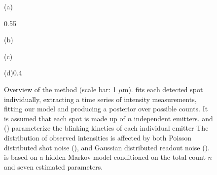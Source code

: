 \begin{figure}[t]

  \begin{panel}{(a)}{\textwidth}
    \vspace{5mm}
    \small
    
    \vspace{-2mm}
  \end{panel}

  \begin{panelcolumn}{0.55\textwidth}
    \begin{panel}{(b)}{\textwidth}
      \small
      \centerline{}
    \end{panel}

    \begin{panel}{(c)}{\textwidth}
      \small
      \hspace{4mm}
      
    \end{panel}
  \end{panelcolumn}
  \begin{panel}{(d)}{0.4\textwidth}
    \small
    \vspace{4mm}
    \hspace{4mm}
    \centerline{}
  \end{panel}

  \caption{
       Overview of the \ours method (scale bar: 1 $\mu$m). 
      \ours fits each detected spot individually, extracting a time series 
      of intensity measurements, fitting our model and producing a posterior 
      over possible counts. It is assumed that each spot is made up of $n$ independent 
      emitters.
       \pon and \poff (\parameterst) parameterize the blinking kinetics 
      of each individual emitter
       The distribution of observed intensities is affected 
      by both Poisson distributed shot noise (\parameterse), and 
        Gaussian distributed readout noise (\parametersc).
       \ours is based on a hidden Markov model conditioned on the 
      total count $n$ and seven estimated parameters.
  }
  \label{fig:method:overview}
\end{figure}
